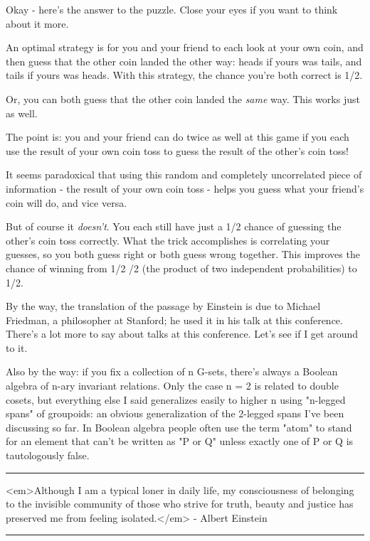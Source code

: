 Okay - here's the answer to the puzzle.  Close your eyes if you want
to think about it more.

An optimal strategy is for you and your friend to each look at your
own coin, and then guess that the other coin landed the other way:
heads if yours was tails, and tails if yours was heads.  With this
strategy, the chance you're both correct is 1/2.

Or, you can both guess that the other coin landed the \emph{same} way.
This works just as well.

The point is: you and your friend can do twice as well at this game if you each
use the result of your own coin toss to guess the result of the other's
coin toss! 

It seems paradoxical that using this random and completely uncorrelated 
piece of information - the result of your own coin toss - helps you 
guess what your friend's coin will do, and vice versa.

But of course it \emph{doesn't}.  You each still have just a 1/2 chance of
guessing the other's coin toss correctly.  What the trick accomplishes
is correlating your guesses, so you both guess right or both guess wrong 
together.  This improves the chance of winning from 1/2 /2 (the 
product of two independent probabilities) to 1/2.

By the way, the translation of the passage by Einstein is due to
Michael Friedman, a philosopher at Stanford; he used it in his talk
at this conference.  There's a lot more to say about talks at this 
conference.  Let's see if I get around to it.

Also by the way: if you fix a collection of n G-sets, there's always a
Boolean algebra of n-ary invariant relations.  Only the case n = 2 is
related to double cosets, but everything else I said generalizes
easily to higher n using "n-legged spans" of groupoids: an
obvious generalization of the 2-legged spans I've been discussing so
far.  In Boolean algebra people often use the term "atom" to
stand for an element that can't be written as "P or Q" unless exactly
one of P or Q is tautologously false.


\par\noindent\rule{\textwidth}{0.4pt}
<em>Although I am a typical loner in daily life, my consciousness
of belonging to the invisible community of those who strive for
truth, beauty and justice has preserved me from feeling isolated.</em> -
Albert Einstein

\par\noindent\rule{\textwidth}{0.4pt}

